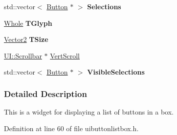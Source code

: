 \begin{DoxyCompactItemize}
\item 
\hypertarget{classphys_1_1UI_1_1ButtonListBox_a1f68770e3eb20daefeefb34fb0f7ad5c}{
std::vector$<$ \hyperlink{classphys_1_1UI_1_1Button}{Button} $\ast$ $>$ {\bfseries Selections}}
\label{classphys_1_1UI_1_1ButtonListBox_a1f68770e3eb20daefeefb34fb0f7ad5c}

\item 
\hypertarget{classphys_1_1UI_1_1ButtonListBox_a4284fcee343ce2bbb178d560a5712e6b}{
\hyperlink{namespacephys_a460f6bc24c8dd347b05e0366ae34f34a}{Whole} {\bfseries TGlyph}}
\label{classphys_1_1UI_1_1ButtonListBox_a4284fcee343ce2bbb178d560a5712e6b}

\item 
\hypertarget{classphys_1_1UI_1_1ButtonListBox_a3b2483012699ef522c592ecefb30a82a}{
\hyperlink{classphys_1_1Vector2}{Vector2} {\bfseries TSize}}
\label{classphys_1_1UI_1_1ButtonListBox_a3b2483012699ef522c592ecefb30a82a}

\item 
\hyperlink{classphys_1_1UI_1_1Scrollbar}{UI::Scrollbar} $\ast$ \hyperlink{classphys_1_1UI_1_1ButtonListBox_aa47d94d75c58e3408a97766eace2c20e}{VertScroll}
\item 
\hypertarget{classphys_1_1UI_1_1ButtonListBox_aee57382752a939219a1bcdc67229dadf}{
std::vector$<$ \hyperlink{classphys_1_1UI_1_1Button}{Button} $\ast$ $>$ {\bfseries VisibleSelections}}
\label{classphys_1_1UI_1_1ButtonListBox_aee57382752a939219a1bcdc67229dadf}

\end{DoxyCompactItemize}


\subsubsection{Detailed Description}
This is a widget for displaying a list of buttons in a box. 

Definition at line 60 of file uibuttonlistbox.h.



